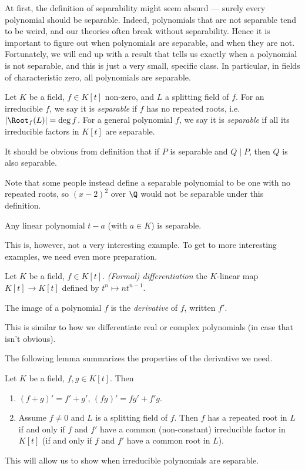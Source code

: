 \documentclass[a4paper]{article}
\begin{document}
At first, the definition of separability might seem absurd --- surely every polynomial should be separable. Indeed, polynomials that are not separable tend to be weird, and our theories often break without separability. Hence it is important to figure out when polynomials are separable, and when they are not. Fortunately, we will end up with a result that tells us exactly when a polynomial is not separable, and this is just a very small, specific class. In particular, in fields of characteristic zero, all polynomials are separable.

\begin{defi}
  Let $K$ be a field, $f\in K[t]$ non-zero, and $L$ a splitting field of $f$. For an irreducible $f$, we say it is \emph{separable} if $f$ has no repeated roots, i.e.\ $|\Root_f(L)| = \deg f$. For a general polynomial $f$, we say it is \emph{separable} if all its irreducible factors in $K[t]$ are separable.
\end{defi}
It should be obvious from definition that if $P$ is separable and $Q \mid P$, then $Q$ is also separable.

Note that some people instead define a separable polynomial to be one with no repeated roots, so $(x - 2)^2$ over $\Q$ would not be separable under this definition.

\begin{eg}
  Any linear polynomial $t - a$ (with $a \in K$) is separable.
\end{eg}
This is, however, not a very interesting example. To get to more interesting examples, we need even more preparation.

\begin{defi}
  Let $K$ be a field, $f \in K[t]$. \emph{(Formal) differentiation} the $K$-linear map $K[t] \to K[t]$ defined by $t^n \mapsto n t^{n - 1}$.

  The image of a polynomial $f$ is the \emph{derivative} of $f$, written $f'$.
\end{defi}
This is similar to how we differentiate real or complex polynomials (in case that isn't obvious).

The following lemma summarizes the properties of the derivative we need.
\begin{lemma}
  Let $K$ be a field, $f, g\in K[t]$. Then
  \begin{enumerate}
    \item $(f + g)' = f' + g'$, $(fg)' = fg' + f'g$.
    \item Assume $f \not= 0$ and $L$ is a splitting field of $f$. Then $f$ has a repeated root in $L$ if and only if $f$ and $f'$ have a common (non-constant) irreducible factor in $K[t]$ (if and only if $f$ and $f'$ have a common root in $L$).
  \end{enumerate}
\end{lemma}
This will allow us to show when irreducible polynomials are separable.
\end{document}
